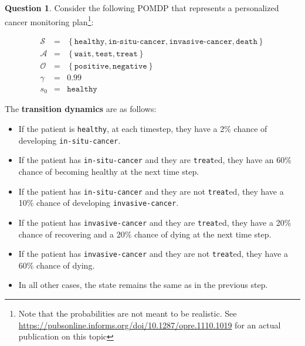 \documentclass{article}
\theoremstyle{definition}
\newtheorem{question}[thm]{Question}
\begin{document}
\begin{question}
    Consider the following POMDP that represents a personalized cancer monitoring plan\footnotemark[1]\footnote{Note that the probabilities are not meant to be realistic. See \url{https://pubsonline.informs.org/doi/10.1287/opre.1110.1019} for an actual publication on this topic}:

\begin{eqnarray*}
    \mathcal{S} &=& \left\{\texttt{healthy}, \texttt{in-situ-cancer}, \texttt{invasive-cancer}, \texttt{death}\right\}\\
    \mathcal{A} &=& \left\{\texttt{wait}, \texttt{test}, \texttt{treat}\right\}\\
    \mathcal{O} &=& \left\{\texttt{positive}, \texttt{negative}\right\}\\
    \gamma &=& 0.99\\
    s_0 &=& \texttt{healthy}
\end{eqnarray*}

The \textbf{transition dynamics} are as follows:
\begin{itemize}[noitemsep]
    \item If the patient is \texttt{healthy}, at each timestep, they have a 2\% chance of developing \texttt{in-situ-cancer}.
    \item If the patient has \texttt{in-situ-cancer} and they are \texttt{treat}ed, they have an 60\% chance of becoming healthy at the next time step.
    \item If the patient has \texttt{in-situ-cancer} and they are not \texttt{treat}ed, they have a 10\% chance of developing \texttt{invasive-cancer}.
    \item If the patient has \texttt{invasive-cancer} and they are \texttt{treat}ed, they have a 20\% chance of recovering and a 20\% chance of dying at the next time step.
    \item If the patient has \texttt{invasive-cancer} and they are not \texttt{treat}ed, they have a 60\% chance of dying.
    \item In all other cases, the state remains the same as in the previous step.
\end{itemize}


\end{question}
\end{document}
